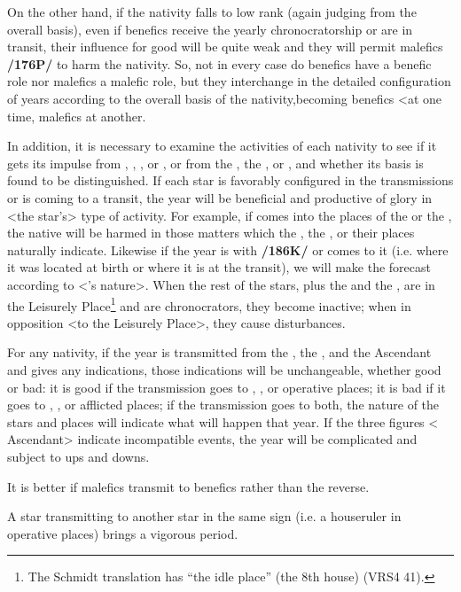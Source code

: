  
On the other hand, if the nativity falls to low rank (again judging from the overall basis), even if benefics receive the yearly chronocratorship or are in transit, their influence for good will be quite weak and they will permit malefics \textbf{/176P/} to harm the nativity. \mnbm So, not in every case do benefics have a benefic role nor  malefics a malefic role, but they \mnmb interchange in the detailed configuration of years according to the overall basis of the nativity,becoming benefics <at one time, malefics at another.

In addition, it is necessary to examine the activities of each nativity to see if it gets its impulse from \Mercury, \Mars, \Venus, or \Saturn, or from the \Sun, the \Moon, or \Jupiter, and whether its basis is found to be distinguished. If each star is favorably configured in the transmissions or is coming to a transit, the year will be beneficial and productive of glory in <the star’s> type of activity. For example, if \Saturn\xspace comes into the places of the \Sun\xspace or the \Moon, the native will be harmed in those matters which the \Sun, the \Moon, or their places naturally indicate. Likewise if the year is with \Saturn\xspace \textbf{/186K/} or comes to it (i.e. where it was located at birth or where it is at the transit), we will make the forecast according to <\Saturn’s
nature>. When the rest of the stars, plus the \Sun\xspace and the \Moon, are in the Leisurely Place\footnote{The Schmidt translation has ``the idle place'' (the 8th house) (VRS4 41).} and are chronocrators, they become inactive; when in opposition <to the Leisurely Place>, they cause disturbances.

For any nativity, if the year is transmitted from the \Sun, the \Moon, and the Ascendant and gives any indications, those indications will be unchangeable, whether good or bad: it is good if the transmission goes to \Venus, \Jupiter, or operative places; it is bad if it goes to \Saturn, \Mars, or afflicted places; if the transmission goes to both, the nature of the stars and places will indicate what will happen that year. If the three figures <\Sun\xspace \Moon\xspace Ascendant> indicate incompatible events, the year will be complicated and
subject to ups and downs. 

It is better if malefics transmit to benefics rather than the reverse. 

A star transmitting to another star in the same sign (i.e. a houseruler in operative places) brings a vigorous period.

